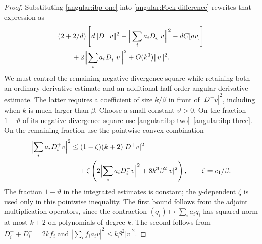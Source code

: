 \documentclass[11pt,a4paper]{article}
\numberwithin{equation}{section}
\begin{document}
\begin{proof}
Substituting \eqref{angular:ibp-one} into
\eqref{angular:Fock-difference} rewrites that expression as
\begin{equation}\label{angular:after-first-ibp}
 \begin{split}
 &(2+2/d)\left[d\|D^+v\|^2
       -\Bigl\|\sum_i a_iD_i^+v\Bigr\|^2-dC[av]\right]\\
 &\qquad+2\Bigl\|\sum_i a_iD_i^-v\Bigr\|^2
                      +O(k^3)\|v\|^2.
 \end{split}
\end{equation}
We must control the remaining negative divergence square while retaining
both an ordinary derivative estimate and an additional half-order
angular derivative estimate.  The latter requires a coefficient of
size $k/\beta$ in front of $|D^+v|^2$, including when $k$ is much larger
than $\beta$.  Choose a small constant $\vartheta>0$.
On the fraction $1-\vartheta$ of its negative divergence square use
\eqref{angular:ibp-two}--\eqref{angular:ibp-three}.  On the remaining
fraction use the pointwise convex combination
\begin{equation}\label{angular:convex-bound}
 \begin{split}
 \Bigl|\sum_i a_iD_i^+v\Bigr|^2
 &\le(1-\zeta)(k+2)|D^+v|^2\\
 &\quad+\zeta\left(2\Bigl|\sum_i a_iD_i^-v\Bigr|^2
                         +8k^3\beta^2|v|^2\right),
 \qquad \zeta=c_1/\beta.
 \end{split}
\end{equation}
The fraction $1-\vartheta$ in the integrated estimates is constant;
the $y$-dependent $\zeta$ is used only in this pointwise inequality.
The first bound follows from the adjoint multiplication operators, since
the contraction $(q_i)\mapsto\sum_i a_iq_i$ has squared norm at most
$k+2$ on polynomials of degree $k$.  The second follows from
$D_i^++D_i^-=2k f_i$ and
$|\sum_i f_i a_i v|^2\le k\beta^2|v|^2$.


\end{proof}
\end{document}
